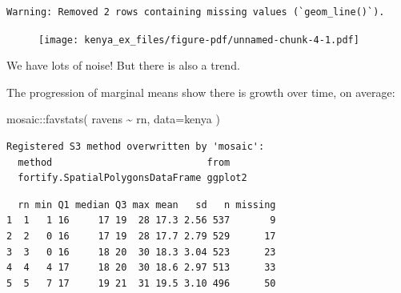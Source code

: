 \documentclass[
  letterpaper,
  DIV=11,
  numbers=noendperiod]{scrreprt}
\newenvironment{Shaded}{\begin{snugshade}}{\end{snugshade}}
\newcommand{\AttributeTok}[1]{\textcolor[rgb]{0.49,0.56,0.16}{#1}}
\newcommand{\DecValTok}[1]{\textcolor[rgb]{0.25,0.63,0.44}{#1}}
\newcommand{\FloatTok}[1]{\textcolor[rgb]{0.25,0.63,0.44}{#1}}
\newcommand{\FunctionTok}[1]{\textcolor[rgb]{0.02,0.16,0.49}{#1}}
\newcommand{\NormalTok}[1]{\textcolor[rgb]{0.00,0.44,0.13}{#1}}
\newcommand{\OtherTok}[1]{\textcolor[rgb]{0.00,0.44,0.13}{#1}}
\newcommand{\SpecialCharTok}[1]{\textcolor[rgb]{0.25,0.44,0.63}{#1}}
\begin{document}
\begin{Shaded}
\end{Shaded}

\begin{verbatim}
Warning: Removed 2 rows containing missing values (`geom_line()`).
\end{verbatim}

\begin{figure}[H]

{\centering \texttt{[image: kenya\_ex\_files/figure-pdf/unnamed-chunk-4-1.pdf]}

}

\end{figure}

We have lots of noise! But there is also a trend.

The progression of marginal means show there is growth over time, on
average:

\begin{Shaded}
\begin{Highlighting}[]
\NormalTok{mosaic}\SpecialCharTok{::}\FunctionTok{favstats}\NormalTok{( ravens }\SpecialCharTok{\textasciitilde{}}\NormalTok{ rn, }\AttributeTok{data=}\NormalTok{kenya )}
\end{Highlighting}
\end{Shaded}

\begin{verbatim}
Registered S3 method overwritten by 'mosaic':
  method                           from   
  fortify.SpatialPolygonsDataFrame ggplot2
\end{verbatim}

\begin{verbatim}
  rn min Q1 median Q3 max mean   sd   n missing
1  1   1 16     17 19  28 17.3 2.56 537       9
2  2   0 16     17 19  28 17.7 2.79 529      17
3  3   0 16     18 20  30 18.3 3.04 523      23
4  4   4 17     18 20  30 18.6 2.97 513      33
5  5   7 17     19 21  31 19.5 3.10 496      50
\end{verbatim}
\end{document}
